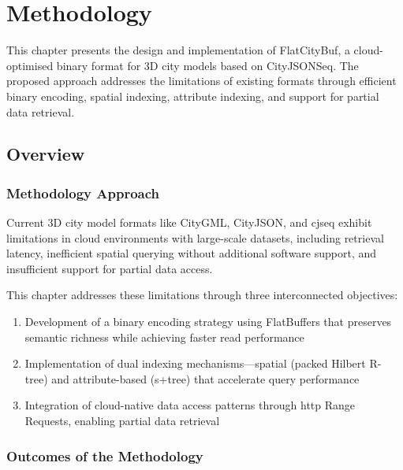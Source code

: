 
\chapter{Methodology}
\label{methodology}

This chapter presents the design and implementation of FlatCityBuf, a cloud-optimised binary format for 3D city models based on CityJSONSeq. The proposed approach addresses the limitations of existing formats through efficient binary encoding, spatial indexing, attribute indexing, and support for partial data retrieval.

\section{Overview}
\label{methodology:overview}

\subsection{Methodology Approach}
\label{methodology:overview:approach}

Current 3D city model formats like CityGML, CityJSON, and \ac{cjseq} exhibit limitations in cloud environments with large-scale datasets, including retrieval latency, inefficient spatial querying without additional software support, and insufficient support for partial data access.

This chapter addresses these limitations through three interconnected objectives:

\begin{enumerate}
  \item Development of a binary encoding strategy using FlatBuffers that preserves semantic richness while achieving faster read performance
  \item Implementation of dual indexing mechanisms—spatial (packed Hilbert R-tree) and attribute-based (\ac{s+tree}) that accelerate query performance
  \item Integration of cloud-native data access patterns through \ac{http} Range Requests, enabling partial data retrieval
\end{enumerate}

\subsection{Outcomes of the Methodology}
\label{methodology:overview:outcomes}


